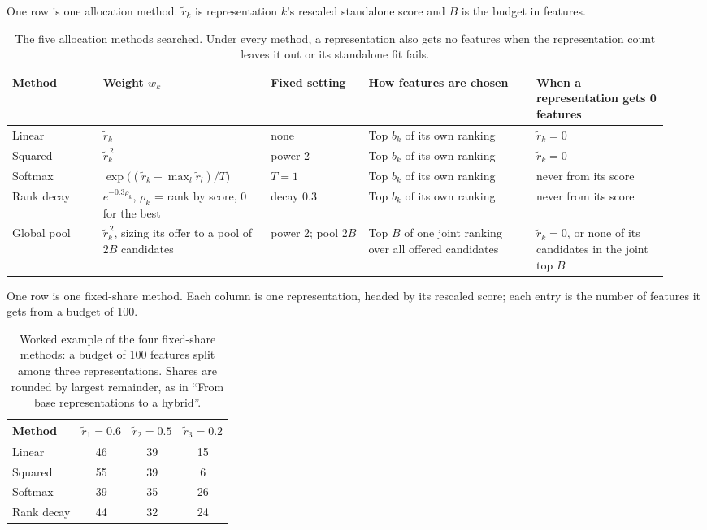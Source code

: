 One row is one allocation method. $\tilde r_k$ is representation $k$'s rescaled standalone score and $B$ is the budget in features.
\begin{table}[htbp]
\centering
\caption{The five allocation methods searched. Under every method, a representation also gets no features when the representation count leaves it out or its standalone fit fails.}
\label{tab:alloc_methods}
\small
\begin{tabular}{@{}p{0.13\linewidth}p{0.24\linewidth}p{0.14\linewidth}p{0.24\linewidth}p{0.19\linewidth}@{}}
\toprule
Method & Weight $w_k$ & Fixed setting & How features are chosen & When a representation gets 0 features \\
\midrule
Linear & $\tilde r_k$ & none & Top $b_k$ of its own ranking & $\tilde r_k = 0$ \\
Squared & $\tilde r_k^{\,2}$ & power 2 & Top $b_k$ of its own ranking & $\tilde r_k = 0$ \\
Softmax & $\exp\big((\tilde r_k - \max_l \tilde r_l)/T\big)$ & $T = 1$ & Top $b_k$ of its own ranking & never from its score \\
Rank decay & $e^{-0.3\rho_k}$, $\rho_k$ = rank by score, 0 for the best & decay 0.3 & Top $b_k$ of its own ranking & never from its score \\
Global pool & $\tilde r_k^{\,2}$, sizing its offer to a pool of $2B$ candidates & power 2; pool $2B$ & Top $B$ of one joint ranking over all offered candidates & $\tilde r_k = 0$, or none of its candidates in the joint top $B$ \\
\bottomrule
\end{tabular}
\end{table}

One row is one fixed-share method. Each column is one representation, headed by its rescaled score; each entry is the number of features it gets from a budget of 100.
\begin{table}[htbp]
\centering
\caption{Worked example of the four fixed-share methods: a budget of 100 features split among three representations. Shares are rounded by largest remainder, as in ``From base representations to a hybrid''.}
\label{tab:alloc_example}
\begin{tabular}{@{}lccc@{}}
\toprule
Method & $\tilde r_1 = 0.6$ & $\tilde r_2 = 0.5$ & $\tilde r_3 = 0.2$ \\
\midrule
Linear & 46 & 39 & 15 \\
Squared & 55 & 39 & 6 \\
Softmax & 39 & 35 & 26 \\
Rank decay & 44 & 32 & 24 \\
\bottomrule
\end{tabular}
\end{table}

